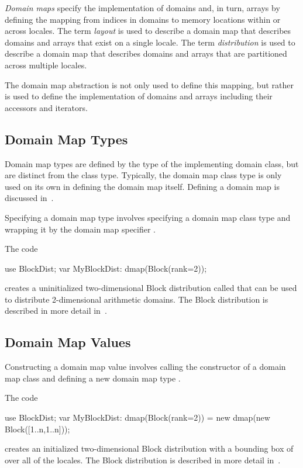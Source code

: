 \label{Domain_Maps}

\emph{Domain maps} specify the implementation of domains and, in turn,
arrays by defining the mapping from indices in domains to memory
locations within or across locales.  The term \emph{layout} is used to
describe a domain map that describes domains and arrays that exist on
a single locale.  The term \emph{distribution} is used to describe a
domain map that describes domains and arrays that are partitioned
across multiple locales.

The domain map abstraction is not only used to define this mapping,
but rather is used to define the implementation of domains and arrays
including their accessors and iterators.

\subsection{Domain Map Types}
\label{Domain_Map_Types}

Domain map types are defined by the type of the implementing domain
class, but are distinct from the class type.  Typically, the domain
map class type is only used on its own in defining the domain map
itself.  Defining a domain map is discussed
in~.

Specifying a domain map type involves specifying a domain map class
type and wrapping it by the domain map specifier .
\begin{example}
The code
\begin{chapel}
use BlockDist;
var MyBlockDist: dmap(Block(rank=2));
\end{chapel}
creates a uninitialized two-dimensional Block distribution
called  that can be used to distribute 2-dimensional
arithmetic domains.  The Block distribution is described in more
detail in~.
\end{example}

\subsection{Domain Map Values}
\label{Domain_Map_Values}

Constructing a domain map value involves calling the constructor of a
domain map class and defining a new domain map type .
\begin{example}
The code
\begin{chapel}
use BlockDist;
var MyBlockDist: dmap(Block(rank=2)) = new dmap(new Block([1..n,1..n]));
\end{chapel}
creates an initialized two-dimensional Block distribution with a
bounding box of \chpl{[1..n, 1..n]} over all of the locales.  The
Block distribution is described in more detail in~.
\end{example}

